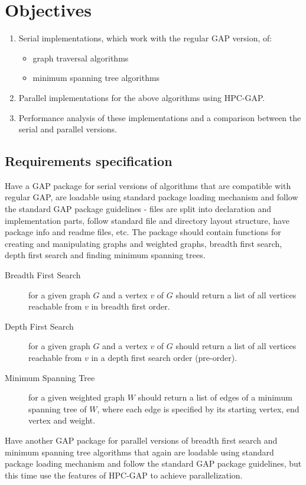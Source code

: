 \documentclass{report}
\theoremstyle{plain}
\theoremstyle{definition}
\theoremstyle{remark}
\begin{document}
\chapter{Objectives}
\begin{enumerate}
  \item Serial implementations, which work with the regular GAP version, of:
  \begin{itemize}
    \item graph traversal algorithms
    \item minimum spanning tree algorithms
  \end{itemize}
  \item Parallel implementations for the above algorithms using HPC-GAP.
  \item Performance analysis of these implementations and a comparison between the serial and parallel versions.
\end{enumerate}

\section{Requirements specification}

Have a GAP package for serial versions of algorithms that are compatible with regular GAP, are loadable using standard package loading mechanism and follow the standard GAP package guidelines - files are split into declaration and implementation parts, follow standard file and directory layout structure, have package info and readme files, etc. The package should contain functions for creating and manipulating graphs and weighted graphs, breadth first search, depth first search and finding minimum spanning trees.
\begin{description}
\item[Breadth First Search] for a given graph $G$ and a vertex $v$ of $G$ should return a list of all vertices reachable from $v$ in breadth first order.
\item[Depth First Search] for a given graph $G$ and a vertex $v$ of $G$ should return a list of all vertices reachable from $v$ in a depth first search order (pre-order).
\item[Minimum Spanning Tree] for a given weighted graph $W$ should return a list of edges of a minimum spanning tree of $W$, where each edge is specified by its starting vertex, end vertex and weight.
\end{description}

Have another GAP package for parallel versions of breadth first search and minimum spanning tree algorithms that again are loadable using standard package loading mechanism and follow the standard GAP package guidelines, but this time use the features of HPC-GAP to achieve parallelization.
\end{document}
